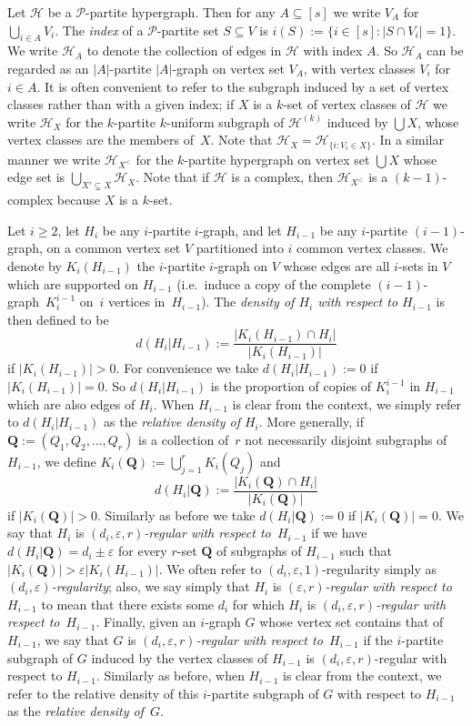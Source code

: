 \documentclass[12pt,a4paper]{amsart}
\let\eps\varepsilon
\newcommand{\Hy}{\mathcal{H}}
\newcommand{\Part}{\mathcal{P}}
\newcommand{\Qb}{\mathbf{Q}}
\begin{document}
Let $\Hy$ be a $\Part$-partite hypergraph.
Then for any $A \subseteq [s]$ we write $V_A$ for $\bigcup_{i \in A} V_i$. The
\emph{index} of a $\Part$-partite set $S \subseteq V$ is $i(S) := \{i \in [s] : |S \cap
V_i| = 1\}$. We write $\Hy_A$ to denote the collection of edges in $\Hy$ with
index $A$. So $\Hy_A$ can be regarded as an $|A|$-partite $|A|$-graph on vertex
set $V_A$, with vertex classes $V_i$ for $i \in A$. It is often convenient to refer to the subgraph induced by a set of vertex classes rather than with a given index; if $X$ is a $k$-set of vertex classes of $\Hy$ we write $\Hy_X$ for the $k$-partite $k$-uniform subgraph of $\Hy^{(k)}$ induced by $\bigcup X$, whose vertex classes are the members of~$X$. Note that $\Hy_X = \Hy_{\{i : V_i \in X\}}$. In a similar manner we write $\Hy_{X^<}$ for the $k$-partite hypergraph on vertex set $\bigcup X$ whose edge set is $\bigcup_{X' \subsetneq X} \Hy_X$. Note that if $\Hy$ is a complex, then $\Hy_{X^<}$ is a $(k-1)$-complex because $X$ is a $k$-set.

Let $i \geq 2$, let $H_i$ be any $i$-partite $i$-graph, and let $H_{i-1}$ be any $i$-partite
$(i-1)$-graph, on a common vertex set $V$ partitioned into $i$ common vertex classes. We denote by
$K_i(H_{i-1})$ the $i$-partite $i$-graph on $V$ whose edges are all
$i$-sets in $V$ which are supported on $H_{i-1}$ (i.e.~induce a copy of the complete $(i-1)$-graph~$K_i^{i-1}$
on~$i$ vertices in~$H_{i-1}$). The \emph{density of $H_i$ with respect to
$H_{i-1}$} is then defined to be \[ d(H_i|H_{i-1}):= \frac{|K_i(H_{i-1})\cap
H_i|}{|K_i(H_{i-1})|}\]
 if
$|K_i(H_{i-1})|>0$. For convenience we take
$d(H_i|H_{i-1}):=0$ if $|K_i(H_{i-1})| = 0$. So $d(H_i|H_{i-1})$ is the proportion of copies of
$K^{i-1}_i$ in $H_{i-1}$ which are also edges of $H_i$. When $H_{i-1}$ is clear from the
context,
we simply refer to $d(H_i | H_{i-1})$ as the \emph{relative density of $H_i$}.
More generally, if $\Qb:=(Q_1,Q_2,\ldots,Q_r)$ is a collection
of~$r$ not necessarily disjoint subgraphs of~$H_{i-1}$, we define $K_i(\Qb):=\bigcup_{j=1}^r K_i(Q_j)$
and \[d(H_i |\Qb):= \frac{|K_i(\Qb)\cap H_i|}{|K_i(\Qb)|}\] if
$|K_i(\Qb)|>0$. Similarly as before we take $d(H_i |\Qb):=0$ if
$|K_i(\Qb)| =0$. 
We say that $H_i$ is \emph{$(d_i,\eps,r)$-regular with respect
to~$H_{i-1}$} if we have $d(H_i|\Qb) = d_i \pm \eps $ for every $r$-set $\Qb$
of subgraphs of $H_{i-1}$ such that $|K_i(\Qb)| > \eps |K_i(H_{i-1})|$. We
often refer to $(d_i,\eps,1)$-regularity simply as
\emph{$(d_i,\eps)$-regularity}; also, we say simply that $H_i$ is \emph{$(\eps,r)$-regular with respect
to~$H_{i-1}$} to mean that there exists some $d_i$ for which $H_i$ is \emph{$(d_i,\eps,r)$-regular with respect
to~$H_{i-1}$}. Finally, given an $i$-graph $G$
whose vertex set contains that of $H_{i-1}$, we say that $G$ is
\emph{$(d_i,\eps,r)$-regular with respect to~$H_{i-1}$} if the $i$-partite subgraph of
$G$ induced by the vertex classes of $H_{i-1}$ is $(d_i,\eps,r)$-regular with respect to
$H_{i-1}$. Similarly as before, when $H_{i-1}$ is clear from the context, we refer to the relative density of this $i$-partite subgraph of $G$ with respect to $H_{i-1}$ as the \emph{relative density of~$G$}.
\end{document}

